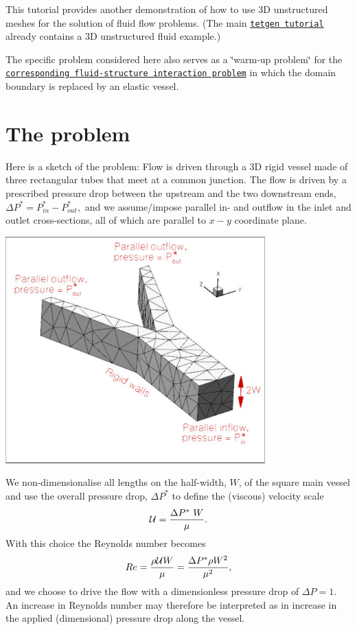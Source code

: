This tutorial provides another demonstration of how to use 3D unstructured meshes for the solution of fluid flow problems. (The main \href{../../../meshes/mesh_from_tetgen/html/index.html}{\tt tetgen tutorial} already contains a 3D unstructured fluid example.)

The specific problem considered here also serves as a \char`\"{}warm-\/up problem\char`\"{} for the \href{../../../interaction/unstructured_three_d_fsi/html/index.html}{\tt corresponding fluid-\/structure interaction problem} in which the domain boundary is replaced by an elastic vessel.



 

\hypertarget{index_problem}{}\section{The problem}\label{index_problem}
Here is a sketch of the problem\+: Flow is driven through a 3D rigid vessel made of three rectangular tubes that meet at a common junction. The flow is driven by a prescribed pressure drop between the upstream and the two downstream ends, $ \Delta P^* = P^*_{in} - P^*_{out}, $ and we assume/impose parallel in-\/ and outflow in the inlet and outlet cross-\/sections, all of which are parallel to $ x-y $ coordinate plane.

 
\begin{DoxyImage}
\includegraphics[width=0.75\textwidth]{problem_sketch}
\end{DoxyImage}


We non-\/dimensionalise all lengths on the half-\/width, $ W $, of the square main vessel and use the overall pressure drop, $ \Delta P^* $ to define the (viscous) velocity scale \[ {\cal U} = \frac{\Delta P^*\ W}{\mu}. \] With this choice the Reynolds number becomes \[ Re = \frac{\rho {\cal U} W }{\mu} = \frac{ \Delta P^* \rho W^2 }{\mu^2}, \] and we choose to drive the flow with a dimensionless pressure drop of $ \Delta P = 1. $ An increase in Reynolds number may therefore be interpreted as in increase in the applied (dimensional) pressure drop along the vessel.



